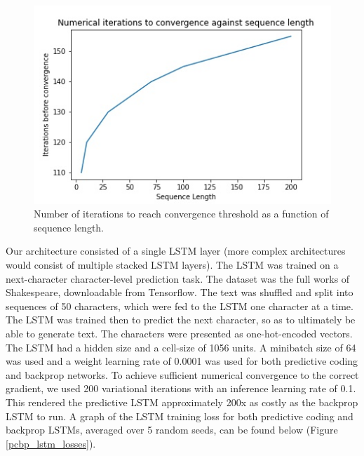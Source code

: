\begin{figure}[ht]
\label{num_iterations_to_converge}
  \centering
  \includegraphics[width=.9\linewidth]{chapter_6_figures/convergence_num_iterations_comparison.jpg}  
\caption{Number of iterations to reach convergence threshold as a function of sequence length.}
\end{figure}

Our architecture consisted of a single LSTM layer (more complex architectures would consist of multiple stacked LSTM layers).
The LSTM was trained on a next-character character-level prediction task. The dataset was the full works of Shakespeare, downloadable from Tensorflow. The text was shuffled and split into sequences of 50 characters, which were fed to the LSTM one character at a time. The LSTM was trained then to predict the next character, so as to ultimately be able to generate text. The characters were presented as one-hot-encoded vectors. The LSTM had a hidden size and a cell-size of 1056 units. A minibatch size of 64 was used and a weight learning rate of 0.0001 was used for both predictive coding and backprop networks. To achieve sufficient numerical convergence to the correct gradient, we used 200 variational iterations with an inference learning rate of 0.1. This rendered the predictive LSTM approximately 200x as costly as the backprop LSTM to run. A graph of the LSTM training loss for both predictive coding and backprop LSTMs, averaged over 5 random seeds, can be found below (Figure \ref{pcbp_lstm_losses}). 

